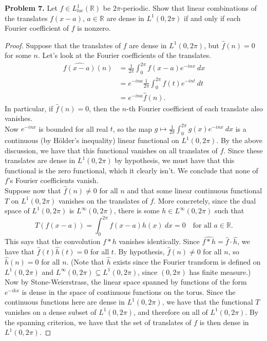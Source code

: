 \documentclass[11pt,letterpaper]{report}
\newcommand{\reals}{\mathbb{R}}
\begin{document}
\noindent\textbf{Problem 7. }
Let $f\in L^1_{loc}(\reals)$ be $2\pi$-periodic. Show that linear combinations of the translates $f(x-a)$, $a\in \reals$ are dense in $L^1(0, 2\pi)$ if and only if each Fourier coefficient of $f$ is nonzero.
\begin{proof}
	Suppose that the translates of $f$ are dense in $L^1(0, 2\pi)$, but $\widehat{f}(n) = 0$ for some $n$. Let's look at the Fourier coefficients of the translates.
	\begin{align*}
	\widehat{f(x-a)}(n) &= \frac{1}{2\pi}\int_0^{2\pi}f(x-a)e^{-inx}\ dx\\
	&= e^{-ina}\frac{1}{2\pi}\int_0^{2\pi}f(t)e^{-int}\ dt\\
	&= e^{-ina}\widehat{f}(n).
	\end{align*}
	In particular, if $\widehat{f}(n) = 0$, then the $n$-th Fourier coefficient of each translate also vanishes.\\

	\noindent Now $e^{-inx}$ is bounded for all real $t$, so the map $g\mapsto \frac{1}{2\pi}\int_0^{2\pi}g(x)e^{-inx}\ dx$ is a continuous (by H\"older's inequality) linear functional on $L^1(0, 2\pi)$. By the above discussion, we have that this functional vanishes on all translates of $f$. Since these translates are dense in $L^1(0, 2\pi)$ by hypothesis, we must have that this functional is the zero functional, which it clearly isn't. We conclude that none of $f$'s Fourier coefficients vanish.\\

	\noindent Suppose now that $\widehat{f}(n)\neq 0$ for all $n$ and that some linear continuous functional $T$ on $L^1(0,2\pi)$ vanishes on the translates of $f$. More concretely, since the dual space of $L^1(0,2\pi)$ is $L^\infty(0,2\pi)$, there is some $h\in L^\infty(0,2\pi)$ such that
	\[
	T(f(x-a)) = \int_0^{2\pi}f(x-a)h(x)\ dx = 0\quad\text{for all }a\in \reals.
	\]
	This says that the convolution $f*h$ vanishes identically. Since $\widehat{f*h} = \widehat{f}\cdot\widehat{h}$, we have that $\widehat{f}(t)\widehat{h}(t) = 0$ for all $t$. By hypothesis, $\widehat{f}(n)\neq 0$ for all $n$, so $\widehat{h}(n) = 0$ for all $n$. (Note that $\widehat{h}$ exists since the Fourier transform is defined on $L^1(0,2\pi)$ and $L^\infty(0,2\pi)\subseteq L^1(0,2\pi)$, since $(0,2\pi)$ has finite measure.)\\

	\noindent Now by Stone-Weierstrass, the linear space spanned by functions of the form $e^{-ikx}$ is dense in the space of continuous functions on the torus. Since the continuous functions here are dense in $L^1(0,2\pi)$, we have that the functional $T$ vanishes on a dense subset of $L^1(0,2\pi)$, and therefore on all of $L^1(0,2\pi)$. By the spanning criterion, we have that the set of translates of $f$ is then dense in $L^1(0,2\pi)$.
\end{proof}
\end{document}
